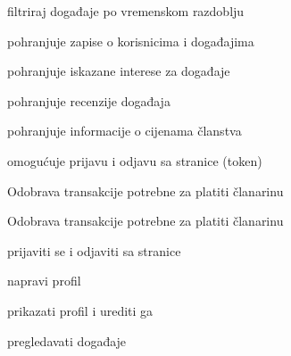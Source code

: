 \begin{packed_enum}
\begin{packed_enum}
\begin{packed_enum}
						\item filtriraj događaje po vremenskom razdoblju
	
					\end{packed_enum}
					
				\end{packed_enum}
				
				\item  {}	
							
				\begin{packed_enum}				
				
					\item pohranjuje zapise o korisnicima i događajima
					\item pohranjuje iskazane interese za događaje
					\item pohranjuje recenzije događaja			
					\item pohranjuje informacije o cijenama članstva
					\item omogućuje prijavu i odjavu sa stranice (token)
				\end{packed_enum}

				\item  {}

				\begin{packed_enum}

				\item Odobrava transakcije potrebne za platiti članarinu

				\end{packed_enum}				
				
				\item  {}				
				
				\begin{packed_enum}
						
				\item Odobrava transakcije potrebne za platiti članarinu 					
					
				\end{packed_enum}
			    
			    \item  {}
				
				\begin{packed_enum}
					
					\item prijaviti se i odjaviti sa stranice
					\item napravi profil
					\item prikazati profil i urediti ga
					\item pregledavati događaje
					\begin{packed_enum}
	

\end{packed_enum}
\end{packed_enum}
\end{packed_enum}
